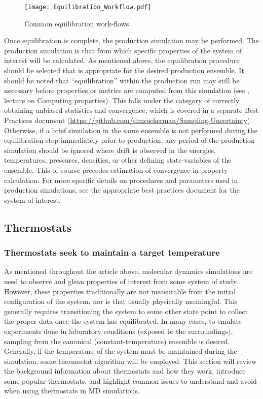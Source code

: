 \documentclass[9pt,bestpractices]{livecoms}
\begin{document}
\begin{figure}[h]
\centering
\texttt{[image: Equilibration\_Workflow.pdf]}
\caption{Common equilibration work-flows}
\label{eqworkflow}
\end{figure}

Once equilibration is complete, the production simulation may be performed.
The production simulation is that from which specific properties of the system of interest will be calculated.
As mentioned above, the equilibration procedure should be selected that is appropriate for the desired production ensemble.
It should be noted that ``equilibration'' within the production run may still be necessary before properties or metrics are computed from this simulation (see \citet{ShellNotes}, lecture on Computing properties).
This falls under the category of correctly obtaining unbiased statistics and convergence, which is covered in a separate Best Practices document (\url{https://github.com/dmzuckerman/Sampling-Uncertainty}). 
Otherwise, if a brief simulation in the same ensemble is not performed during the equilibration step immediately prior to production, any period of the production simulation should be ignored where drift is observed in the energies, temperatures, pressures, densities, or other defining state-variables of the ensemble.
This of course precedes estimation of convergence in property calculation.
For more specific details on procedures and parameters used in production simulations, see the appropriate best practices document for the system of interest.

\subsection{Thermostats}
\label{sec:thermostats}

\subsubsection{Thermostats seek to maintain a target temperature}
As mentioned throughout the article above, molecular dynamics simulations are used to observe and glean properties of interest from some system of
study.
However, these properties traditionally are not measurable from the initial configuration of the system, nor is that usually physically meaningful.
This generally requires transitioning the system to some other state point to collect the proper data once the system has equilibrated.
In many cases, to emulate experiments done in laboratory conditions (exposed to the surroundings), sampling from the canonical (constant-temperature) ensemble is desired\cite{thermostatAlgorithms2005}.
Generally, if the temperature of the system must be maintained during the simulation, some thermostat algorithm will be employed. 
This section will review the background information about thermostats and how they work, introduce some popular thermostats, and highlight common issues to understand and avoid when using thermostats in MD simulations.
\end{document}
